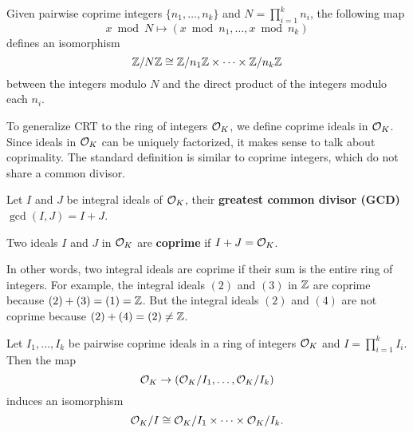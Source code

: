 \documentclass[../main.tex]{subfiles}
\begin{document}
\iffalse
\label{subsubsec:crt}

Given pairwise coprime integers $\{ n_1,\ldots,n_k\}$ and $N=\prod_{i=1}^k n_i$, the following map 
\reversemarginpar
{}
\begin{equation*}
    x \bmod N \mapsto (x \bmod n_1, \dots, x\bmod n_k)
\end{equation*}
defines an isomorphism 
\begin{equation*}
    \mathbb{Z} / N\mathbb{Z} \cong \mathbb{Z} / n_1 \mathbb{Z} \times \cdots \times \mathbb{Z} / n_k \mathbb{Z}
\end{equation*}
between the integers modulo $N$ and the direct product of the integers modulo each $n_i$. 

To generalize CRT to the ring of integers $\mathcal{O}_K$, we define coprime ideals in $\mathcal{O}_K$. Since ideals in $\mathcal{O}_K$ can be uniquely factorized, it makes sense to talk about coprimality. The standard definition is similar to coprime integers, which do not share a common divisor.  

\begin{definition}
\reversemarginpar
{}
Let $I$ and $J$ be integral ideals of $\mathcal{O}_K$, their \textbf{greatest common divisor (GCD)} $\gcd(I, J) = I+J$. 
\end{definition}

\begin{definition}
\label{def:coprimeIdeal}
\reversemarginpar
{}
Two ideals $I$ and $J$ in $\mathcal{O}_K$ are \textbf{coprime} if $I+J=\mathcal{O}_K$.
\end{definition}
In other words, two integral ideals are coprime if their sum is the entire ring of integers.
For example, the integral ideals $(2)$ and $(3)$ in $\mathbb{Z}$ are coprime because $(2)+(3)=(1)=\mathbb{Z}$. But the integral ideals $(2)$ and $(4)$ are not coprime because $(2)+(4)=(2) \neq \mathbb{Z}$. 

\begin{theorem}
\label{thm:crtInOK}
\reversemarginpar
{}
   Let $I_1, \dots, I_k$ be pairwise coprime ideals in a ring of integers $\mathcal{O}_K$ and $I = \prod_{i=1}^k I_i$. Then the map 
   \begin{equation*}
       \mathcal{O}_K \rightarrow (\mathcal{O}_K / I_1, \dots, \mathcal{O}_K/I_k)
   \end{equation*}
   induces an isomorphism 
   \begin{equation*}
       \mathcal{O}_K / I \cong \mathcal{O}_K / I_1 \times \cdots \times \mathcal{O}_K / I_k.
   \end{equation*}
\end{theorem}
\end{document}
